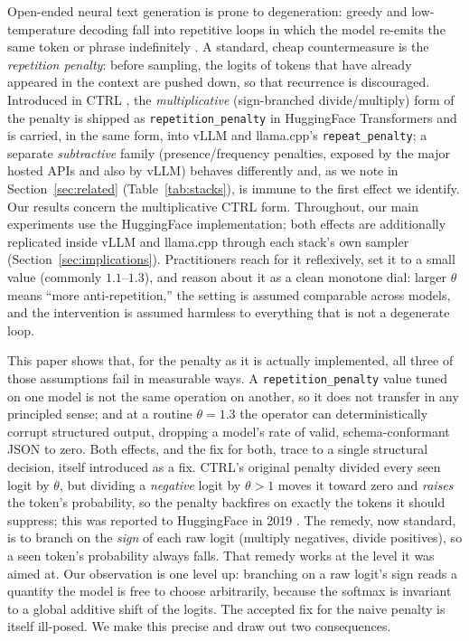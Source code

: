 \documentclass[11pt]{article}
\newcommand{\thp}{\theta}
\newcommand{\code}[1]{\texttt{#1}}
\begin{document}
Open-ended neural text generation is prone to degeneration: greedy and low-temperature
decoding fall into repetitive loops in which the model re-emits the same token or phrase
indefinitely \citep{holtzman2020curious,welleck2020unlikelihood}. A standard, cheap
countermeasure is the \emph{repetition penalty}: before sampling, the logits of tokens
that have already appeared in the context are pushed down, so that recurrence is
discouraged. Introduced in CTRL \citep{keskar2019ctrl}, the \emph{multiplicative} (sign-branched
divide/multiply) form of the penalty is shipped as \code{repetition\_penalty} in HuggingFace
Transformers \citep{wolf2020transformers} and is carried, in the same form, into vLLM and
llama.cpp's \code{repeat\_penalty}; a separate \emph{subtractive} family
(presence/frequency penalties, exposed by the major hosted APIs and also by vLLM) behaves
differently and, as we note in Section~\ref{sec:related} (Table~\ref{tab:stacks}), is immune
to the first effect we identify. Our results concern the multiplicative CTRL form. Throughout,
our main experiments use the HuggingFace implementation; both effects are additionally
replicated inside vLLM and llama.cpp through each stack's own sampler
(Section~\ref{sec:implications}). Practitioners reach for it reflexively,
set it to a small value
(commonly $1.1$--$1.3$), and reason about it as a clean monotone dial: larger
$\thp$ means ``more anti-repetition,'' the setting is assumed comparable across
models, and the intervention is assumed harmless to everything that is not a degenerate
loop.

This paper shows that, for the penalty as it is actually implemented, all three of those
assumptions fail in measurable ways. A \code{repetition\_penalty} value
tuned on one model is not the same operation on another, so it does not transfer in any
principled sense; and at a routine $\thp=1.3$ the operator can deterministically corrupt
structured output, dropping a model's rate of valid, schema-conformant JSON to zero. Both
effects, and the fix for both, trace to a single structural decision, itself introduced as a
fix. CTRL's original penalty divided every seen logit by $\thp$, but dividing a
\emph{negative} logit by $\thp>1$ moves it toward zero and \emph{raises} the token's
probability, so the penalty backfires on exactly the tokens it should suppress; this was
reported to HuggingFace in 2019 \citep{hf2302}. The remedy, now standard, is to branch on the
\emph{sign} of each raw logit (multiply negatives, divide positives), so a seen token's
probability always falls. That remedy works at the level it was aimed at. Our observation is
one level up:
branching on a raw logit's sign reads a quantity the model is free to choose arbitrarily,
because the softmax is invariant to a global additive shift of the logits. The accepted
fix for the naive penalty is itself ill-posed. We make this precise and draw out two
consequences.
\end{document}
